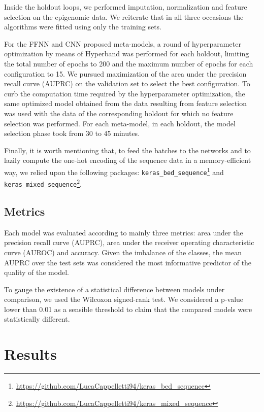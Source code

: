 \documentclass{article}
\begin{document}
Inside the holdout loops, we performed imputation, normalization and feature selection on the epigenomic data. We reiterate that in all three occasions the algorithms were fitted using only the training sets.

For the FFNN and CNN proposed meta-models, a round of hyperparameter optimization by means of Hyperband was performed for each holdout, limiting the total number of epochs to 200 and the maximum number of epochs for each configuration to 15. We pursued maximization of the area under the precision recall curve (AUPRC) on the validation set to select the best configuration. To curb the computation time required by the hyperparameter optimization, the same optimized model obtained from the data resulting from feature selection was used with the data of the corresponding holdout for which no feature selection was performed. For each meta-model, in each holdout, the model selection phase took from 30 to 45 minutes.  

Finally, it is worth mentioning that, to feed the batches to the networks and to lazily compute the one-hot encoding of the sequence data in a memory-efficient way, we relied upon the following packages: \texttt{keras\_bed\_sequence}\footnote{\url{https://github.com/LucaCappelletti94/keras_bed_sequence}} and \texttt{keras\_mixed\-\_sequence}\footnote{\url{https://github.com/LucaCappelletti94/keras_mixed_sequence}}.


\subsection{Metrics}
\label{subsec:exp:metrics}

Each model was evaluated according to mainly three metrics: area under the precision recall curve (AUPRC), area under the receiver operating characteristic curve (AUROC) and accuracy. Given the imbalance of the classes, the mean AUPRC over the test sets was considered the most informative predictor of the quality of the model.

To gauge the existence of a statistical difference between models under comparison, we used the Wilcoxon signed-rank test. We considered a p-value lower than 0.01 as a sensible threshold to claim that the compared models were statistically different.  

\section{Results}
\label{sec:results}
\end{document}
